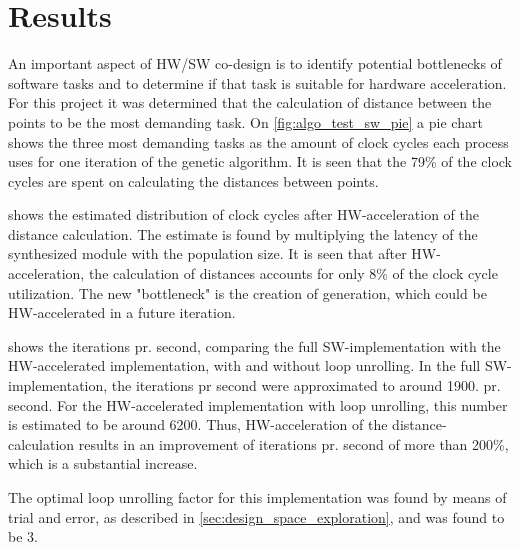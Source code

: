 
\chapter{Results}
An important aspect of HW/SW co-design is to identify potential bottlenecks of software tasks and to determine if that task is suitable for hardware acceleration. For this project it was determined that the calculation of distance between the points to be the most demanding task. On \cref{fig:algo_test_sw_pie} a pie chart shows the three most demanding tasks as the amount of clock cycles each process uses for one iteration of the genetic algorithm. It is seen that the 79\% of the clock cycles are spent on calculating the distances between points.

 shows the estimated distribution of clock cycles after HW-acceleration of the distance calculation. The estimate is found by multiplying the latency of the synthesized module with the population size. It is seen that after HW-acceleration, the calculation of distances accounts for only 8\% of the clock cycle utilization. The new "bottleneck" is the creation of generation, which could be HW-accelerated in a future iteration.

 shows the iterations pr. second, comparing the full SW-implementation with the HW-accelerated implementation, with and without loop unrolling. In the full SW-implementation, the iterations pr second were approximated to around 1900. pr. second. For the HW-accelerated implementation with loop unrolling, this number is estimated to be around 6200. Thus, HW-acceleration of the distance-calculation results in an improvement of iterations pr. second of more than 200\%, which is a substantial increase.

The optimal loop unrolling factor for this implementation was found by means of trial and error, as described in \cref{sec:design_space_exploration}, and was found to be 3.


